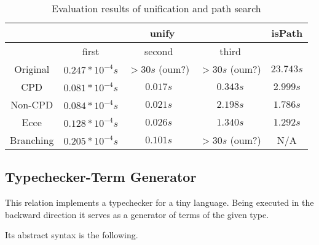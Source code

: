 \begin{table}
  \centering
  \begin{tabular}{c||c|c|c||c}
                   & \multicolumn{3}{c}{unify} & isPath \\
  \hline
                   & first  & second & third   &        \\
  \hline\hline
  Original         & $0.247*10^{-4}s$ & $>30s$ (oum?) & $>30s$ (oum?) & $23.743s$ \\
  \hline
  CPD              & $0.081*10^{-4}s$ & $0.017s$ & $0.343s$  & $2.999s$  \\
  \hline
  Non-CPD          & $0.084*10^{-4}s$ & $0.021s$ & $2.198s$  & $1.786s$  \\
  \hline
  Ecce             & $0.128*10^{-4}s$ & $0.026s$ & $1.340s$  & $1.292s$ \\
  \hline
  Branching        & $0.205*10^{-4}s$ & $0.101s$ & $>30s$ (oum?) & N/A \\
  \hline
  \end{tabular}

  \caption{Evaluation results of unification and path search}
  \label{tbl:unify}
\end{table}

\subsection{Typechecker-Term Generator}

This relation implements a typechecker for a tiny language. Being executed in the backward direction it serves as a generator of terms of the given type.

Its abstract syntax is the following.


